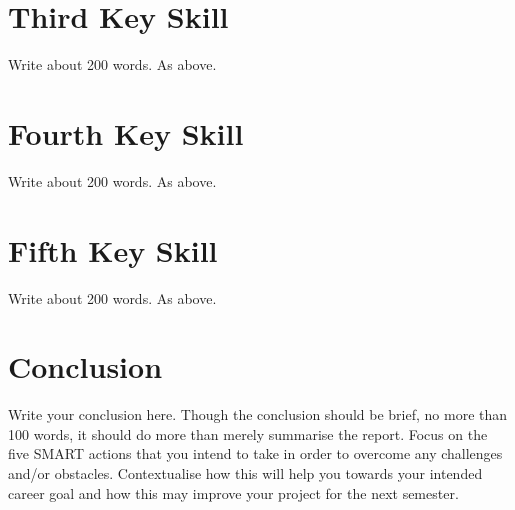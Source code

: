 \documentclass{scrartcl}
\begin{document}
\section{Third Key Skill}

Write about 200 words. As above.

\section{Fourth Key Skill}

Write about 200 words. As above.

\section{Fifth Key Skill}

Write about 200 words. As above.

\section{Conclusion}

Write your conclusion here. Though the conclusion should be brief, no more than 100 words, it should do more than merely summarise the report. Focus on the five SMART actions that you intend to take in order to overcome any challenges and/or obstacles. Contextualise how this will help you towards your intended career goal and how this may improve your project for the next semester.



\end{document}
